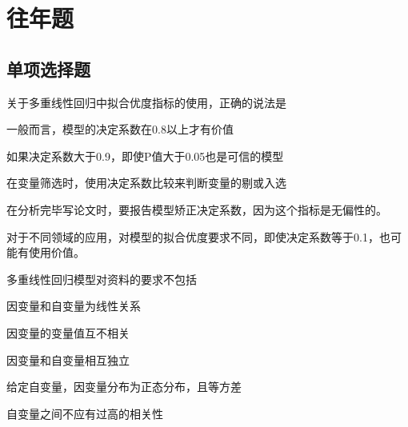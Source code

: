
\label{chapter:2}

\section{往年题}

\subsection{单项选择题}

\par\addvspace{6pt}\noindent\begin{minipage}{\linewidth}


关于多重线性回归中拟合优度指标的使用，正确的说法是


\begin{choices}

\item 一般而言，模型的决定系数在0.8以上才有价值

\item 如果决定系数大于0.9，即使P值大于0.05也是可信的模型

\item 在变量筛选时，使用决定系数比较来判断变量的剔或入选

\item 在分析完毕写论文时，要报告模型矫正决定系数，因为这个指标是无偏性的。

\item 对于不同领域的应用，对模型的拟合优度要求不同，即使决定系数等于0.1，也可能有使用价值。

\end{choices}

\end{minipage}\par\vspace{4pt}

\par\addvspace{6pt}\noindent\begin{minipage}{\linewidth}


多重线性回归模型对资料的要求不包括


\begin{choices}

\item 因变量和自变量为线性关系

\item 因变量的变量值互不相关

\item 因变量和自变量相互独立

\item 给定自变量，因变量分布为正态分布，且等方差

\item 自变量之间不应有过高的相关性

\end{choices}

\end{minipage}\par\vspace{4pt}

